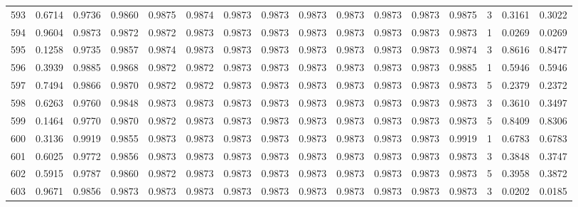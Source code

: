 \begin{tabular}{lrrrrrrrrrrrrrrr}
593 &      0.6714 &  0.9736 &  0.9860 &  0.9875 &  0.9874 &  0.9873 &  0.9873 &  0.9873 &  0.9873 &  0.9873 &   0.9873 &     0.9875 &      3 &                    0.3161 &                     0.3022 \\
594 &      0.9604 &  0.9873 &  0.9872 &  0.9872 &  0.9873 &  0.9873 &  0.9873 &  0.9873 &  0.9873 &  0.9873 &   0.9873 &     0.9873 &      1 &                    0.0269 &                     0.0269 \\
595 &      0.1258 &  0.9735 &  0.9857 &  0.9874 &  0.9873 &  0.9873 &  0.9873 &  0.9873 &  0.9873 &  0.9873 &   0.9873 &     0.9874 &      3 &                    0.8616 &                     0.8477 \\
596 &      0.3939 &  0.9885 &  0.9868 &  0.9872 &  0.9872 &  0.9873 &  0.9873 &  0.9873 &  0.9873 &  0.9873 &   0.9873 &     0.9885 &      1 &                    0.5946 &                     0.5946 \\
597 &      0.7494 &  0.9866 &  0.9870 &  0.9872 &  0.9872 &  0.9873 &  0.9873 &  0.9873 &  0.9873 &  0.9873 &   0.9873 &     0.9873 &      5 &                    0.2379 &                     0.2372 \\
598 &      0.6263 &  0.9760 &  0.9848 &  0.9873 &  0.9873 &  0.9873 &  0.9873 &  0.9873 &  0.9873 &  0.9873 &   0.9873 &     0.9873 &      3 &                    0.3610 &                     0.3497 \\
599 &      0.1464 &  0.9770 &  0.9870 &  0.9872 &  0.9873 &  0.9873 &  0.9873 &  0.9873 &  0.9873 &  0.9873 &   0.9873 &     0.9873 &      5 &                    0.8409 &                     0.8306 \\
600 &      0.3136 &  0.9919 &  0.9855 &  0.9873 &  0.9873 &  0.9873 &  0.9873 &  0.9873 &  0.9873 &  0.9873 &   0.9873 &     0.9919 &      1 &                    0.6783 &                     0.6783 \\
601 &      0.6025 &  0.9772 &  0.9856 &  0.9873 &  0.9873 &  0.9873 &  0.9873 &  0.9873 &  0.9873 &  0.9873 &   0.9873 &     0.9873 &      3 &                    0.3848 &                     0.3747 \\
602 &      0.5915 &  0.9787 &  0.9860 &  0.9872 &  0.9873 &  0.9873 &  0.9873 &  0.9873 &  0.9873 &  0.9873 &   0.9873 &     0.9873 &      5 &                    0.3958 &                     0.3872 \\
603 &      0.9671 &  0.9856 &  0.9873 &  0.9873 &  0.9873 &  0.9873 &  0.9873 &  0.9873 &  0.9873 &  0.9873 &   0.9873 &     0.9873 &      3 &                    0.0202 &                     0.0185 \\

\end{tabular}

